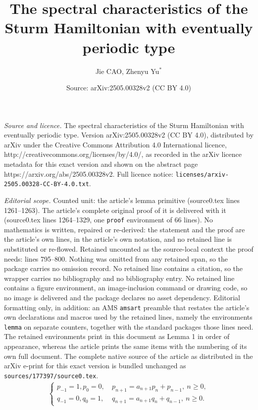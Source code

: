 \documentclass[10pt,a4paper]{amsart}
\title{The spectral characteristics of the Sturm Hamiltonian with eventually periodic type}
\author{Jie CAO, Zhenyu Yu$^*$}
\date{Source: arXiv:2505.00328v2 (CC BY 4.0)}
\begin{document}
\maketitle

\noindent\emph{Source and licence.} The spectral characteristics of the Sturm Hamiltonian with eventually periodic type. Version arXiv:2505.00328v2 (CC BY 4.0), distributed by arXiv under the Creative Commons Attribution 4.0 International licence, http://creativecommons.org/licenses/by/4.0/, as recorded in the arXiv licence metadata for this exact version and shown on the abstract page https://arxiv.org/abs/2505.00328v2. Full licence notice: \texttt{licenses/arxiv-2505.00328-CC-BY-4.0.txt}.\par\smallskip

\noindent\textit{Editorial scope.} Counted unit: the article's lemma primitive (source0.tex lines 1261--1263). The article's complete original proof of it is delivered with it (source0.tex lines 1264--1329, one \texttt{proof} environment of 66 lines). No mathematics is written, repaired or re-derived: the statement and the proof are the article's own lines, in the article's own notation, and no retained line is substituted or re-flowed.  Retained uncounted as the source-local context the proof needs: lines 795--800.  Nothing was omitted from any retained span, so the package carries no omission record.  No retained line contains a citation, so the wrapper carries no bibliography and no bibliography entry.  No retained line contains a figure environment, an image-inclusion command or drawing code, so no image is delivered and the package declares no asset dependency.  Editorial formatting only, in addition: an AMS \texttt{amsart} preamble that restates the article's own declarations and macros used by the retained lines, namely the environments \texttt{lemma} on separate counters, together with the standard packages those lines need.  The retained environments print in this document as Lemma 1 in order of appearance, whereas the article prints the same items with the numbering of its own full document.  The complete native source of the article as distributed in the arXiv e-print for this exact version is bundled unchanged as \texttt{sources/177397/source0.tex}.
	\begin{align}\label{q-n}
		\begin{cases}
			p_{-1}=1, p_0=0,\  &p_{n+1}=a_{n+1}p_n+p_{n-1},\ n\geq0, \\
			q_{-1}=0, q_0=1,\ &q_{n+1}=a_{n+1}q_n+q_{n-1},\ n\geq0.
		\end{cases}
	\end{align}
\end{document}
